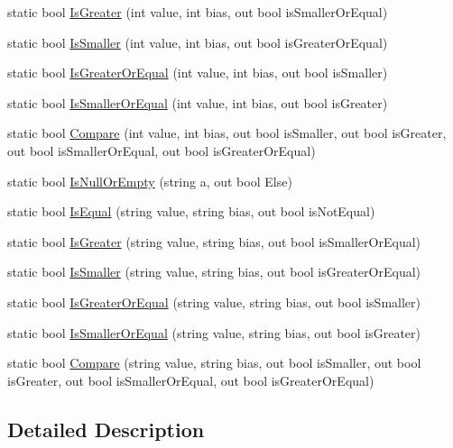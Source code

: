 \begin{DoxyCompactItemize}
static bool \hyperlink{classi_c_s___conditions_a4d0e9a27cc1dc4052feea7a7087d9b57}{Is\+Greater} (int value, int bias, out bool is\+Smaller\+Or\+Equal)
\item 
static bool \hyperlink{classi_c_s___conditions_ae83072da07a1e8759ed0fa42bc0eee42}{Is\+Smaller} (int value, int bias, out bool is\+Greater\+Or\+Equal)
\item 
static bool \hyperlink{classi_c_s___conditions_a07e3eb110953be3436b5652384f7f09b}{Is\+Greater\+Or\+Equal} (int value, int bias, out bool is\+Smaller)
\item 
static bool \hyperlink{classi_c_s___conditions_a018a4a8b6e24ad34a1f796791f88b504}{Is\+Smaller\+Or\+Equal} (int value, int bias, out bool is\+Greater)
\item 
static bool \hyperlink{classi_c_s___conditions_a0fd68096f8db40fcc451964142e523e9}{Compare} (int value, int bias, out bool is\+Smaller, out bool is\+Greater, out bool is\+Smaller\+Or\+Equal, out bool is\+Greater\+Or\+Equal)
\item 
static bool \hyperlink{classi_c_s___conditions_a6e8079ab2b4f846e5640f00d07afe034}{Is\+Null\+Or\+Empty} (string a, out bool Else)
\item 
static bool \hyperlink{classi_c_s___conditions_a241816d6f0ba145958fee49811c07053}{Is\+Equal} (string value, string bias, out bool is\+Not\+Equal)
\item 
static bool \hyperlink{classi_c_s___conditions_ac2dfa7c71498225e8dd5cfe9d81a97b3}{Is\+Greater} (string value, string bias, out bool is\+Smaller\+Or\+Equal)
\item 
static bool \hyperlink{classi_c_s___conditions_a4afdf5193f45f11cb49408f5e2cd51a5}{Is\+Smaller} (string value, string bias, out bool is\+Greater\+Or\+Equal)
\item 
static bool \hyperlink{classi_c_s___conditions_af816e87a16e01d67aa057c3a1440a4f5}{Is\+Greater\+Or\+Equal} (string value, string bias, out bool is\+Smaller)
\item 
static bool \hyperlink{classi_c_s___conditions_adc6a67f0099befef7641abcbb7fe1674}{Is\+Smaller\+Or\+Equal} (string value, string bias, out bool is\+Greater)
\item 
static bool \hyperlink{classi_c_s___conditions_a7f53dbd2acce6613c884e9ecb0cf8075}{Compare} (string value, string bias, out bool is\+Smaller, out bool is\+Greater, out bool is\+Smaller\+Or\+Equal, out bool is\+Greater\+Or\+Equal)
\end{DoxyCompactItemize}


\subsection{Detailed Description}


